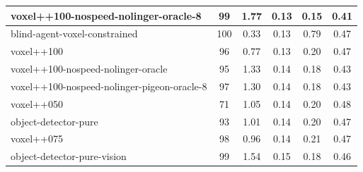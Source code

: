 \begin{table}
\begin{longtable}{|l|c|c|c|c|c|}
voxel++100-nospeed-nolinger-oracle-8 & 99 & {\cellcolor[HTML]{6EB6A7}} \color[HTML]{F1F1F1} 1.77 & {\cellcolor[HTML]{EBF2F0}} \color[HTML]{000000} 0.13 & {\cellcolor[HTML]{EBF2F0}} \color[HTML]{000000} 0.15 & 	{\cellcolor[HTML]{C3DFD9}} \color[HTML]{000000} 0.41 \\ \hline
blind-agent-voxel-constrained & 100 & {\cellcolor[HTML]{DEECE9}} \color[HTML]{000000} 0.33 & {\cellcolor[HTML]{EBF2F0}} \color[HTML]{000000} 0.13 & {\cellcolor[HTML]{7BBCAF}} \color[HTML]{000000} 0.79 & 	{\cellcolor[HTML]{E2EEEB}} \color[HTML]{000000} 0.47 \\ \hline
voxel++100 & 96 & {\cellcolor[HTML]{BCDCD5}} \color[HTML]{000000} 0.77 & {\cellcolor[HTML]{EBF2F0}} \color[HTML]{000000} 0.13 & {\cellcolor[HTML]{E3EEEC}} \color[HTML]{000000} 0.20 & 	{\cellcolor[HTML]{DEECE8}} \color[HTML]{000000} 0.47 \\ \hline
voxel++100-nospeed-nolinger-oracle & 95 & {\cellcolor[HTML]{90C6BB}} \color[HTML]{000000} 1.33 & {\cellcolor[HTML]{EBF2F0}} \color[HTML]{000000} 0.14 & {\cellcolor[HTML]{E7F0EE}} \color[HTML]{000000} 0.18 & 	{\cellcolor[HTML]{CBE3DE}} \color[HTML]{000000} 0.43 \\ \hline
voxel++100-nospeed-nolinger-pigeon-oracle-8 & 97 & {\cellcolor[HTML]{93C8BD}} \color[HTML]{000000} 1.30 & {\cellcolor[HTML]{EBF2F0}} \color[HTML]{000000} 0.14 & {\cellcolor[HTML]{E7F0EE}} \color[HTML]{000000} 0.18 & 	{\cellcolor[HTML]{CCE3DF}} \color[HTML]{000000} 0.43 \\ \hline
voxel++050 & 71 & {\cellcolor[HTML]{A6D1C8}} \color[HTML]{000000} 1.05 & {\cellcolor[HTML]{EBF2F0}} \color[HTML]{000000} 0.14 & {\cellcolor[HTML]{E3EFEC}} \color[HTML]{000000} 0.20 & 	{\cellcolor[HTML]{E6F0ED}} \color[HTML]{000000} 0.48 \\ \hline
object-detector-pure & 93 & {\cellcolor[HTML]{A9D2CA}} \color[HTML]{000000} 1.01 & {\cellcolor[HTML]{EBF2F0}} \color[HTML]{000000} 0.14 & {\cellcolor[HTML]{E3EEEC}} \color[HTML]{000000} 0.20 & 	{\cellcolor[HTML]{E1EDEA}} \color[HTML]{000000} 0.47 \\ \hline
voxel++075 & 98 & {\cellcolor[HTML]{ADD4CC}} \color[HTML]{000000} 0.96 & {\cellcolor[HTML]{EBF2F0}} \color[HTML]{000000} 0.14 & {\cellcolor[HTML]{E2EEEB}} \color[HTML]{000000} 0.21 & 	{\cellcolor[HTML]{DFECE9}} \color[HTML]{000000} 0.47 \\ \hline
object-detector-pure-vision & 99 & {\cellcolor[HTML]{80BFB2}} \color[HTML]{000000} 1.54 & {\cellcolor[HTML]{EBF2F0}} \color[HTML]{000000} 0.15 & {\cellcolor[HTML]{E6F0EE}} \color[HTML]{000000} 0.18 & 	{\cellcolor[HTML]{D9EAE6}} \color[HTML]{000000} 0.46 \\ \hline

\end{longtable}
\end{table}
